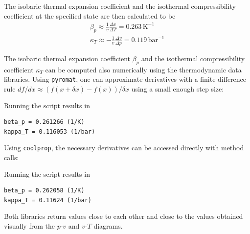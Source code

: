 \begin{example}
\begin{center}
    \end{center}

    The isobaric thermal expansion coefficient and the isothermal compressibility coefficient at the specified state are then calculated to be
    \begin{align*}
        \beta_p\approx\frac{1}{v}\frac{\Delta v}{\Delta T}=0.263\,\text{K}^{-1}\\
        \kappa_T\approx-\frac{1}{v}\frac{\Delta v}{\Delta p}=0.119\,\text{bar}^{-1}
    \end{align*}
\end{example}
\begin{example}
    The isobaric thermal expansion coefficient $\beta_p$ and the isothermal compressibility coefficient $\kappa_T$ can be computed also numerically using the thermodynamic data libraries.         
    Using \verb|pyromat|, one can approximate derivatives with a finite difference rule $df/dx\approx (f(x+\delta x)-f(x))/\delta x$ using a small enough step size:
    
    Running the script results in
    \begin{Verbatim}
beta_p = 0.261266 (1/K)
kappa_T = 0.116053 (1/bar)
    \end{Verbatim}
    Using \verb|coolprop|, the necessary derivatives can be accessed directly with method calls:
    
    Running the script results in 
    \begin{Verbatim}
beta_p = 0.262058 (1/K)
kappa_T = 0.11624 (1/bar)
    \end{Verbatim}
    Both libraries return values close to each other and close to the values obtained visually from the $p$-$v$ and $v$-$T$ diagrams.
\end{example}


